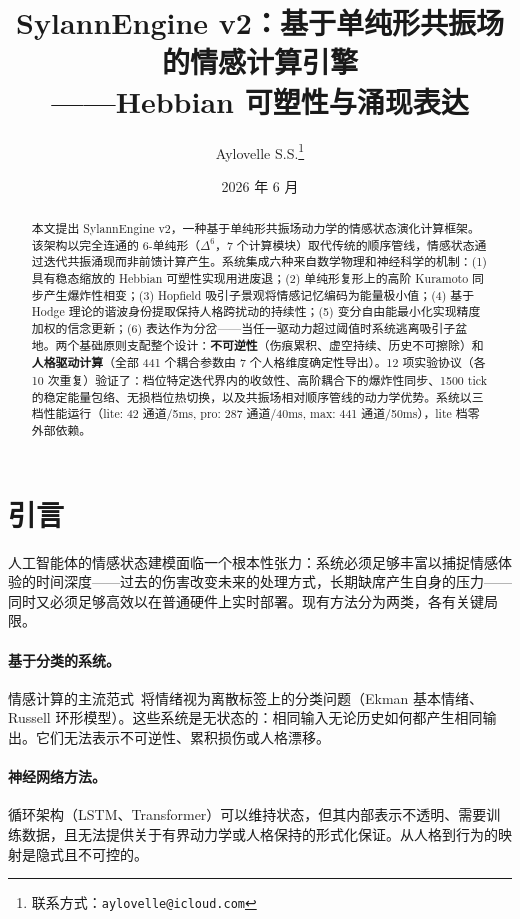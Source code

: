 \documentclass[UTF8,11pt]{ctexart}
\title{SylannEngine v2：基于单纯形共振场的情感计算引擎\\——Hebbian 可塑性与涌现表达}
\author{Aylovelle S.S.\thanks{联系方式：\texttt{aylovelle@icloud.com}}}
\date{2026 年 6 月}
\begin{document}
\maketitle

\begin{abstract}
本文提出 SylannEngine v2，一种基于单纯形共振场动力学的情感状态演化计算框架。该架构以完全连通的 6-单纯形（$\Delta^6$，7 个计算模块）取代传统的顺序管线，情感状态通过迭代共振涌现而非前馈计算产生。系统集成六种来自数学物理和神经科学的机制：(1) 具有稳态缩放的 Hebbian 可塑性实现用进废退；(2) 单纯形复形上的高阶 Kuramoto 同步产生爆炸性相变；(3) Hopfield 吸引子景观将情感记忆编码为能量极小值；(4) 基于 Hodge 理论的谐波身份提取保持人格跨扰动的持续性；(5) 变分自由能最小化实现精度加权的信念更新；(6) 表达作为分岔——当任一驱动力超过阈值时系统逃离吸引子盆地。两个基础原则支配整个设计：\textbf{不可逆性}（伤痕累积、虚空持续、历史不可擦除）和\textbf{人格驱动计算}（全部 441 个耦合参数由 7 个人格维度确定性导出）。12 项实验协议（各 10 次重复）验证了：档位特定迭代界内的收敛性、高阶耦合下的爆炸性同步、1500 tick 的稳定能量包络、无损档位热切换，以及共振场相对顺序管线的动力学优势。系统以三档性能运行（lite: 42 通道/5ms, pro: 287 通道/40ms, max: 441 通道/50ms），lite 档零外部依赖。
\end{abstract}

\section{引言}
\label{sec:intro}

人工智能体的情感状态建模面临一个根本性张力：系统必须足够丰富以捕捉情感体验的时间深度——过去的伤害改变未来的处理方式，长期缺席产生自身的压力——同时又必须足够高效以在普通硬件上实时部署。现有方法分为两类，各有关键局限。

\paragraph{基于分类的系统。}情感计算的主流范式~\cite{picard1997}将情绪视为离散标签上的分类问题（Ekman 基本情绪、Russell 环形模型）。这些系统是无状态的：相同输入无论历史如何都产生相同输出。它们无法表示不可逆性、累积损伤或人格漂移。

\paragraph{神经网络方法。}循环架构（LSTM、Transformer）可以维持状态，但其内部表示不透明、需要训练数据，且无法提供关于有界动力学或人格保持的形式化保证。从人格到行为的映射是隐式且不可控的。
\end{document}
